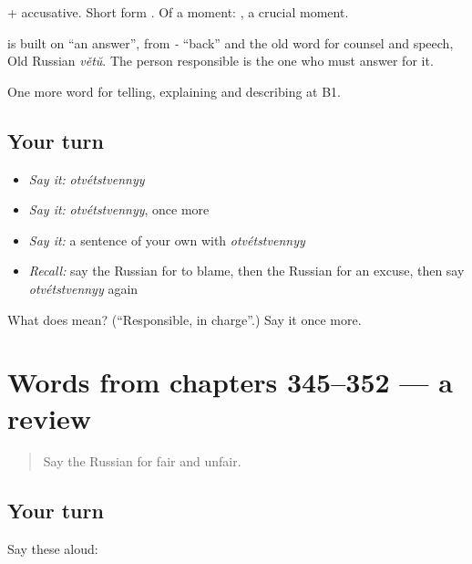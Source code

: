 \emph{ } + accusative. Short form \emph{}. Of a moment: \emph{ }, a crucial moment.

\begin{cousinweb}
\textbf{} is built on \emph{} \textquotedblleft{}an answer\textquotedblright{}, from \emph{-} \textquotedblleft{}back\textquotedblright{} and the old word for counsel and speech, Old Russian \emph{větŭ}. The person responsible is the one who must answer for it.
\end{cousinweb}

\begin{grammarlens}[title={What you've built}]
One more word for telling, explaining and describing at B1.
\end{grammarlens}

\subsection*{Your turn}
\begin{itemize}
\raggedright
  \item \emph{Say it:} \emph{otvétstvennyy}
  \item \emph{Say it:} \emph{otvétstvennyy}, once more
  \item \emph{Say it:} a sentence of your own with \emph{otvétstvennyy}
  \item \emph{Recall:} say the Russian for to blame, then the Russian for an excuse, then say \emph{otvétstvennyy} again
\end{itemize}

\begin{tcolorbox}[breakable,colback=teal!4,colframe=teal!35!black,title={Before you move on}]
What does  mean? (\textquotedblleft{}Responsible, in charge\textquotedblright{}.) Say it once more.
\end{tcolorbox}
\section[(dialogue)]{Words from chapters 345–352 — a review}

\label{lesson:RU-R352-review-345-352}



\begin{quote}
Say the Russian for fair and unfair.
\end{quote}

\subsection*{Your turn}
Say these aloud:

